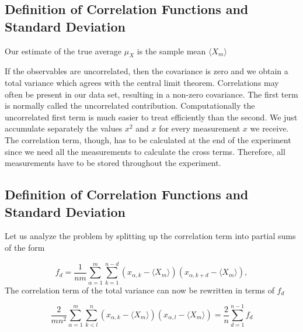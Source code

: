 \documentclass[%
oneside,                 %
final,                   %
10pt]{article}
\newenvironment{block_mdfboxadmon}[1][]{
\begin{block_mdfboxmdframed}[frametitle=#1]
}
{
\end{block_mdfboxmdframed}
}
\begin{document}
\subsection{Definition of Correlation Functions and Standard Deviation}

\begin{block_mdfboxadmon}[]
Our estimate of the true average $\mu_{X}$ is the sample mean $\langle X_m \rangle$

If the 
observables are uncorrelated, then the covariance is zero and we obtain a total variance
which agrees with the central limit theorem. Correlations may often be present in our data set, resulting in a non-zero covariance.  The first term is normally called the uncorrelated 
contribution.
Computationally the uncorrelated first term is much easier to treat
efficiently than the second.
We just accumulate separately the values $x^2$ and $x$ for every
measurement $x$ we receive. The correlation term, though, has to be
calculated at the end of the experiment since we need all the
measurements to calculate the cross terms. Therefore, all measurements
have to be stored throughout the experiment.
\end{block_mdfboxadmon} %



\subsection{Definition of Correlation Functions and Standard Deviation}

\begin{block_mdfboxadmon}[]

Let us analyze the problem by splitting up the correlation term into
partial sums of the form

\begin{equation*}
f_d = \frac{1}{nm}\sum_{\alpha=1}^m\sum_{k=1}^{n-d}(x_{\alpha,k}-\langle X_m \rangle)(x_{\alpha,k+d}-\langle X_m \rangle),
\end{equation*}
The correlation term of the total variance can now be rewritten in terms of
$f_d$

\begin{equation*}
\frac{2}{mn^2}\sum_{\alpha=1}^m\sum_{k<l}^n (x_{\alpha,k}-\langle X_m \rangle)(x_{\alpha,l}-\langle X_m \rangle)=
\frac{2}{n}\sum_{d=1}^{n-1} f_d
\end{equation*}
\end{block_mdfboxadmon} %
\end{document}
